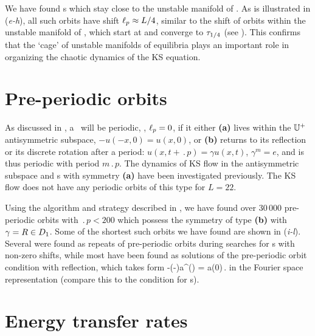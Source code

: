 

We have found \rpo s which stay
close to the unstable manifold of .
As is illustrated in (\textit{e-h}), all such orbits have
shift $\ell_p \approx L/4$, similar to the shift of orbits within
the unstable manifold of , which start at  and
converge to $\tau_{1/4}$ (see ). This
confirms that the `cage' of unstable manifolds of equilibria plays
an important role in organizing the chaotic dynamics of the KS
equation.


\section{Pre-periodic orbits} \label{ssec:po}

As discussed in , a \rpo\ will be
periodic, \ie, $\ell_p = 0$, if it either {\bf (a)} lives
within the $\mathbb{U}^+$ antisymmetric subspace, $-u(-x,0) =
u(x,0)$, or {\bf (b)} returns to its reflection
or its discrete rotation after a period:
$u(x,t+\period{p})=\gamma u(x,t)$, $\gamma^m=e$,
and is thus periodic with period $m\period{p}$.
The dynamics of KS flow in the antisymmetric subspace and \po
s with symmetry {\bf (a)} have been investigated
previously.
The KS flow does not have any periodic orbits of this type
for $L = 22$.

Using the algorithm and strategy described in
, we have found over 30\,000
pre-periodic orbits with $\period{p} < 200$ which possess the
symmetry of type {\bf (b)} with $\gamma=R\in D_1$.
Some of the shortest such orbits we have found are shown in
(\textit{i-l}). Several were found as
repeats of pre-periodic orbits during searches for \rpo s
with non-zero shifts, while most have been found as solutions
of the pre-periodic orbit condition  with
reflection, which takes form
\beq
 -(-\shift)a^\ast() = a(0)\,.
\label{KSposFour}
\eeq
in the Fourier space representation
(compare this to the condition  for \rpo s).


\section{Energy transfer rates}
\label{sec:energyL22}


